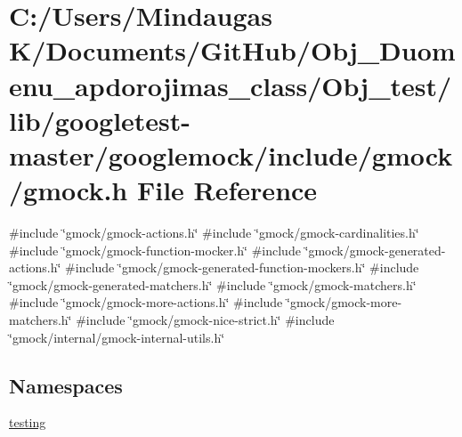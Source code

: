 \hypertarget{_obj__test_2lib_2googletest-master_2googlemock_2include_2gmock_2gmock_8h}{}\section{C\+:/\+Users/\+Mindaugas K/\+Documents/\+Git\+Hub/\+Obj\+\_\+\+Duomenu\+\_\+apdorojimas\+\_\+class/\+Obj\+\_\+test/lib/googletest-\/master/googlemock/include/gmock/gmock.h File Reference}
\label{_obj__test_2lib_2googletest-master_2googlemock_2include_2gmock_2gmock_8h}
{\ttfamily \#include \char`\"{}gmock/gmock-\/actions.\+h\char`\"{}}\newline
{\ttfamily \#include \char`\"{}gmock/gmock-\/cardinalities.\+h\char`\"{}}\newline
{\ttfamily \#include \char`\"{}gmock/gmock-\/function-\/mocker.\+h\char`\"{}}\newline
{\ttfamily \#include \char`\"{}gmock/gmock-\/generated-\/actions.\+h\char`\"{}}\newline
{\ttfamily \#include \char`\"{}gmock/gmock-\/generated-\/function-\/mockers.\+h\char`\"{}}\newline
{\ttfamily \#include \char`\"{}gmock/gmock-\/generated-\/matchers.\+h\char`\"{}}\newline
{\ttfamily \#include \char`\"{}gmock/gmock-\/matchers.\+h\char`\"{}}\newline
{\ttfamily \#include \char`\"{}gmock/gmock-\/more-\/actions.\+h\char`\"{}}\newline
{\ttfamily \#include \char`\"{}gmock/gmock-\/more-\/matchers.\+h\char`\"{}}\newline
{\ttfamily \#include \char`\"{}gmock/gmock-\/nice-\/strict.\+h\char`\"{}}\newline
{\ttfamily \#include \char`\"{}gmock/internal/gmock-\/internal-\/utils.\+h\char`\"{}}\newline
\subsection*{Namespaces}
\begin{DoxyCompactItemize}
\item 
 \mbox{\hyperlink{namespacetesting}{testing}}
\end{DoxyCompactItemize}
